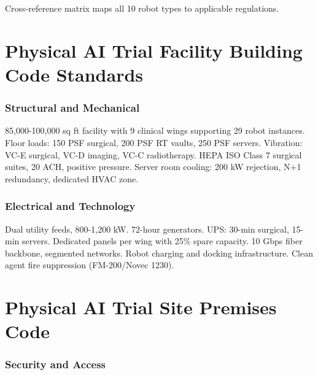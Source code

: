 \documentclass[11pt,letterpaper]{article}
\begin{document}
Cross-reference matrix maps all 10 robot types to applicable regulations.

\newpage


\part{Physical AI Trial Facility Building Code Standards}

\section{Structural and Mechanical}

85,000-100,000 sq ft facility with 9 clinical wings supporting 29 robot
instances. Floor loads: 150 PSF surgical, 200 PSF RT vaults, 250 PSF servers.
Vibration: VC-E surgical, VC-D imaging, VC-C radiotherapy. HEPA ISO Class 7
surgical suites, 20 ACH, positive pressure. Server room cooling: 200 kW
rejection, N+1 redundancy, dedicated HVAC zone.

\section{Electrical and Technology}

Dual utility feeds, 800-1,200 kW. 72-hour generators. UPS: 30-min surgical,
15-min servers. Dedicated panels per wing with 25\% spare capacity. 10 Gbps
fiber backbone, segmented networks. Robot charging and docking infrastructure.
Clean agent fire suppression (FM-200/Novec 1230).

\newpage


\part{Physical AI Trial Site Premises Code}

\section{Security and Access}
\end{document}

